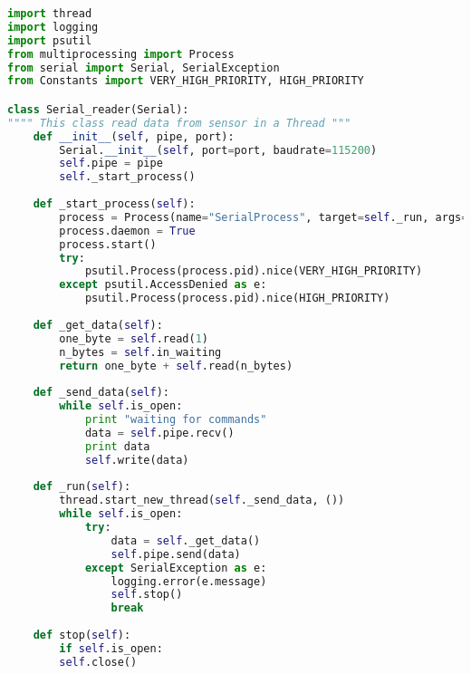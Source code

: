\documentclass[hidelinks,11pt,a4paper,oneside,article]{memoir}
\begin{document}
\begin{lstlisting}[label={listing:serial-reader},caption={Serial Reader Class},language=Python, style=styleprogramming]
import thread
import logging
import psutil
from multiprocessing import Process
from serial import Serial, SerialException
from Constants import VERY_HIGH_PRIORITY, HIGH_PRIORITY

class Serial_reader(Serial):
"""" This class read data from sensor in a Thread """
    def __init__(self, pipe, port):
        Serial.__init__(self, port=port, baudrate=115200)
        self.pipe = pipe
        self._start_process()
    
    def _start_process(self):
        process = Process(name="SerialProcess", target=self._run, args=())
        process.daemon = True
        process.start()
        try:
            psutil.Process(process.pid).nice(VERY_HIGH_PRIORITY)
        except psutil.AccessDenied as e:
            psutil.Process(process.pid).nice(HIGH_PRIORITY)
    
    def _get_data(self):
        one_byte = self.read(1)
        n_bytes = self.in_waiting
        return one_byte + self.read(n_bytes)
    
    def _send_data(self):
        while self.is_open:
            print "waiting for commands"
            data = self.pipe.recv()
            print data
            self.write(data)
    
    def _run(self):
        thread.start_new_thread(self._send_data, ())
        while self.is_open:
            try:
                data = self._get_data()
                self.pipe.send(data)
            except SerialException as e:
                logging.error(e.message)
                self.stop()
                break
    
    def stop(self):
        if self.is_open:
        self.close()

\end{lstlisting}\vspace{14pt}
\end{document}
